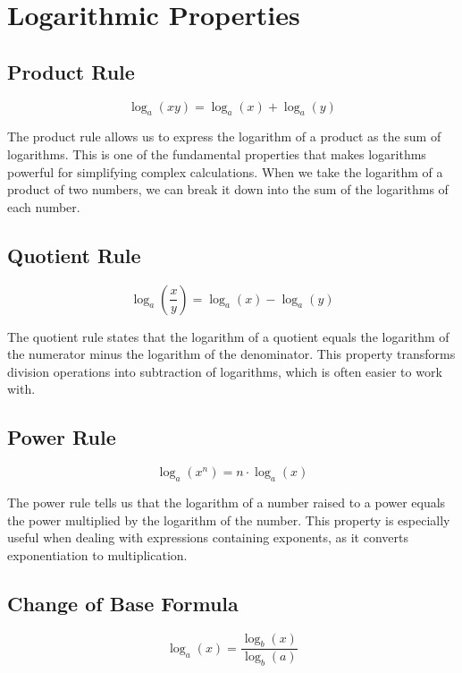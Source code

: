 \documentclass{article}
\begin{document}
\section*{Logarithmic Properties}

\subsection*{Product Rule}
\begin{equation}
  \log_a(xy) = \log_a(x) + \log_a(y)
\end{equation}

The product rule allows us to express the logarithm of a product as the sum of logarithms. This is one of the fundamental properties that makes logarithms powerful for simplifying complex calculations. When we take the logarithm of a product of two numbers, we can break it down into the sum of the logarithms of each number.

\subsection*{Quotient Rule}
\begin{equation}
  \log_a\left(\frac{x}{y}\right) = \log_a(x) - \log_a(y)
\end{equation}

The quotient rule states that the logarithm of a quotient equals the logarithm of the numerator minus the logarithm of the denominator. This property transforms division operations into subtraction of logarithms, which is often easier to work with.

\subsection*{Power Rule}
\begin{equation}
  \log_a(x^n) = n \cdot \log_a(x)
\end{equation}

The power rule tells us that the logarithm of a number raised to a power equals the power multiplied by the logarithm of the number. This property is especially useful when dealing with expressions containing exponents, as it converts exponentiation to multiplication.

\subsection*{Change of Base Formula}
\begin{equation}
  \log_a(x) = \frac{\log_b(x)}{\log_b(a)}
\end{equation}
\end{document}
